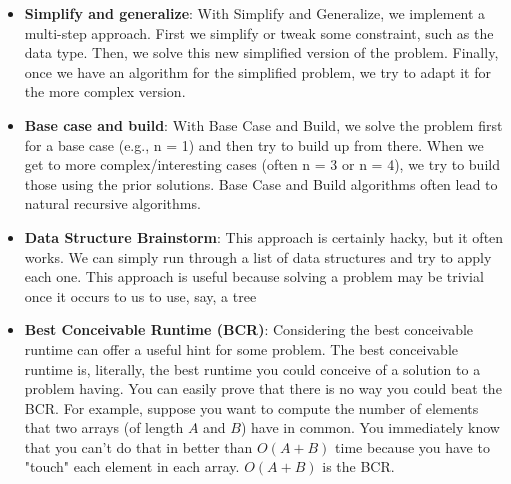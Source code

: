 \documentclass{report}
\begin{document}
\begin{itemize}
            \bigbreak \noindent 
            Our brains are funny like this. Throw the phrase "Design an algorithm" in there and people often get all jumbled up. But give people an actual example-whether just of the data (e.g., an array) or of the real-life parallel (e.g., a pile of papers)-and their intuition gives them a very nice algorithm.
            \bigbreak \noindent 
            I've seen this come up countless times with candidates. Their computer algorithm is extraordinarily slow, but when asked to solve the same problem manually, they immediately do something quite fast. (And it's not too surprisingly, in some sense.Things that are slow for a computer are often slow by hand. Why would you put yourself through extra work?)
            \bigbreak \noindent 
            Therefore, when you get a question, try just working it through intuitively on a real example. Often a bigger example will be easier.
        \item \textbf{Simplify and generalize}: With Simplify and Generalize, we implement a multi-step approach. First we simplify or tweak some constraint, such as the data type. Then, we solve this new simplified version of the problem. Finally, once we have an algorithm for the simplified problem, we try to adapt it for the more complex version.
        \item \textbf{Base case and build}: With Base Case and Build, we solve the problem first for a base case (e.g., n = 1) and then try to build up from there. When we get to more complex/interesting cases (often n = 3 or n = 4), we try to build those using the prior solutions.
            \bigbreak \noindent 
            Base Case and Build algorithms often lead to natural recursive algorithms.
        \item \textbf{Data Structure Brainstorm}: This approach is certainly hacky, but it often works. We can simply run through a list of data structures and try to apply each one. This approach is useful because solving a problem may be trivial once it occurs to us to use, say, a tree
        \item \textbf{Best Conceivable Runtime (BCR)}: Considering the best conceivable runtime can offer a useful hint for some problem.
            \bigbreak \noindent 
            The best conceivable runtime is, literally, the best runtime you could conceive of a solution to a problem having. You can easily prove that there is no way you could beat the BCR.
            \bigbreak \noindent 
            For example, suppose you want to compute the number of elements that two arrays (of length $A$ and $B$) have in common. You immediately know that you can't do that in better than $O(A + B)$ time because you have to "touch" each element in each array. $O(A + B)$ is the BCR.

\end{itemize}
\end{document}
